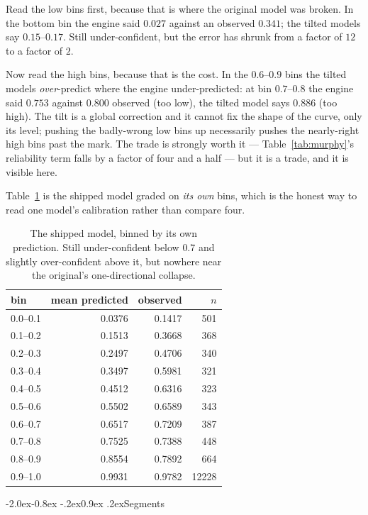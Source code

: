 \documentclass[10pt,a4paper]{article}
\makeatletter
\theoremstyle{plain}
\theoremstyle{definition}
\theoremstyle{remark}
\renewcommand\subsection{\@startsection{subsection}{2}{\z@}%
  {-2.0ex\@plus -0.8ex \@minus -.2ex}{0.9ex \@plus .2ex}{\normalfont\large\bfseries}}
\makeatother
\begin{document}
Read the low bins first, because that is where the original model was broken. In the
bottom bin the engine said $0.027$ against an observed $0.341$; the tilted models say
$0.15$--$0.17$. Still under-confident, but the error has shrunk from a factor of $12$ to
a factor of $2$.

Now read the high bins, because that is the cost. In the $0.6$--$0.9$ bins the tilted
models \emph{over}-predict where the engine under-predicted: at bin $0.7$--$0.8$ the
engine said $0.753$ against $0.800$ observed (too low), the tilted model says $0.886$
(too high). The tilt is a global correction and it cannot fix the shape of the curve, only
its level; pushing the badly-wrong low bins up necessarily pushes the nearly-right high
bins past the mark. The trade is strongly worth it --- Table~\ref{tab:murphy}'s
reliability term falls by a factor of four and a half --- but it is a trade, and it is
visible here.

Table~\ref{tab:relship} is the shipped model graded on \emph{its own} bins, which is the
honest way to read one model's calibration rather than compare four.

\begin{table}[htbp]
\centering
\small
\begin{tabular}{lrrr}
\toprule
bin & mean predicted & observed & $n$ \\
\midrule
0.0--0.1 & 0.0376 & 0.1417 & 501 \\
0.1--0.2 & 0.1513 & 0.3668 & 368 \\
0.2--0.3 & 0.2497 & 0.4706 & 340 \\
0.3--0.4 & 0.3497 & 0.5981 & 321 \\
0.4--0.5 & 0.4512 & 0.6316 & 323 \\
0.5--0.6 & 0.5502 & 0.6589 & 343 \\
0.6--0.7 & 0.6517 & 0.7209 & 387 \\
0.7--0.8 & 0.7525 & 0.7388 & 448 \\
0.8--0.9 & 0.8554 & 0.7892 & 664 \\
0.9--1.0 & 0.9931 & 0.9782 & 12228 \\
\bottomrule
\end{tabular}
\caption{The shipped model, binned by its own prediction. Still under-confident below
$0.7$ and slightly over-confident above it, but nowhere near the original's
one-directional collapse.}
\label{tab:relship}
\end{table}

\subsection{Segments}
\end{document}
